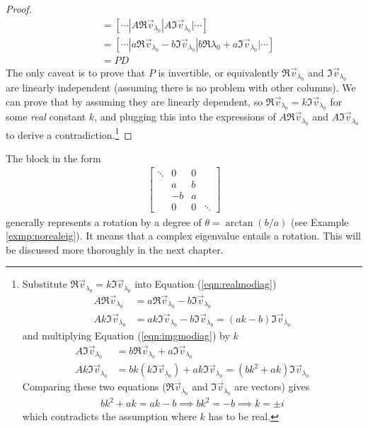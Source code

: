 \begin{proof}
\begin{align*}
&= [\cdots|A\Re{\vec{v}_{\lambda_0}}|A\Im{\vec{v}_{\lambda_0}}|\cdots] \\
&= [\cdots|a\Re{\vec{v}_{\lambda_0}} - b\Im{\vec{v}_{\lambda_0}} | b\Re{\lambda_0} + a\Im{\vec{v}_{\lambda_0}}|\cdots] \\
&= PD
\end{align*}
The only caveat is to prove that $P$ is invertible, or equivalently $\Re{\vec{v}_{\lambda_0}}$ and $\Im{\vec{v}_{\lambda_0}}$ are linearly independent (assuming there is no problem with other columns). We can prove that by assuming they are linearly dependent, so $\Re{\vec{v}_{\lambda_0}} = k\Im{\vec{v}_{\lambda_0}}$ for some \textit{real} constant $k$, and plugging this into the expressions of $A\Re{\vec{v}_{\lambda_0}}$ and $A\Im{\vec{v}_{\lambda_0}}$ to derive a contradiction.\footnote{Substitute $\Re{\vec{v}_{\lambda_0}} = k\Im{\vec{v}_{\lambda_0}}$ into Equation (\ref{eqn:realmodiag})
\begin{align*}
A\Re{\vec{v}_{\lambda_0}} &= a\Re{\vec{v}_{\lambda_0}} - b\Im{\vec{v}_{\lambda_0}} \\
Ak\Im{\vec{v}_{\lambda_0}} &= ak\Im{\vec{v}_{\lambda_0}} - b\Im{\vec{v}_{\lambda_0}} = (ak-b)\Im{\vec{v}_{\lambda_0}}
\end{align*}
and multiplying Equation (\ref{eqn:imgmodiag}) by $k$
\begin{align*}
A\Im{\vec{v}_{\lambda_0}} &= b\Re{\vec{v}_{\lambda_0}} + a\Im{\vec{v}_{\lambda_0}} \\
Ak \Im{\vec{v}_{\lambda_0}} &= bk(k\Im{\vec{v}_{\lambda_0}}) + ak\Im{\vec{v}_{\lambda_0}} = (bk^2 + ak)\Im{\vec{v}_{\lambda_0}}
\end{align*}
Comparing these two equations ($\Re{\vec{v}_{\lambda_0}}$ and $\Im{\vec{v}_{\lambda_0}}$ are  vectors) gives
\begin{align*}
bk^2 + ak = ak - b \implies bk^2 = -b \implies k = \pm i
\end{align*}
which contradicts the assumption where $k$ has to be real.}
\end{proof}

The block in the form
\begin{align*}
\begin{bmatrix}
\ddots & 0 & 0 & \\
& a & b & \\
& -b & a & \\
& 0 & 0 & \ddots
\end{bmatrix}    
\end{align*}
generally represents a rotation by a degree of $\theta = \arctan(b/a)$ (see Example \ref{exmp:norealeig}). It means that a complex eigenvalue entails a rotation. This will be discussed more thoroughly in the next chapter.


